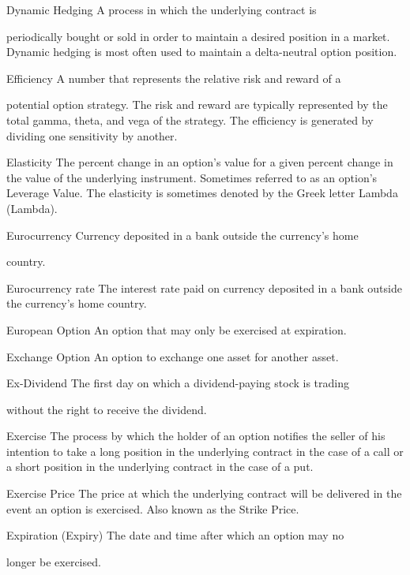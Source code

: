 Dynamic Hedging A  process  in  which  the  underlying  contract  is\par
periodically bought or sold in order to maintain a desired position in a market. Dynamic hedging is most often used to maintain a delta-neutral option position.\par
Efficiency A number that represents the relative risk and reward of a\par
potential option strategy. The risk and reward are typically represented by the total gamma, theta, and vega of the strategy. The efficiency is generated by dividing one sensitivity by another.\par
Elasticity The percent change in an option's value for a given percent change in the value of the underlying instrument. Sometimes referred to as an option's Leverage Value. The elasticity is sometimes denoted by the Greek letter Lambda (Lambda).\par
Eurocurrency Currency deposited in a bank outside the currency's home\par
country.\par
Eurocurrency rate The interest rate paid on currency deposited in a bank outside the currency's home country.\par
European Option An option that may only be exercised at expiration.\par
Exchange Option An option to exchange one asset for another asset.\par
Ex-Dividend The first day on which a dividend-paying stock is trading\par
without the right to receive the dividend.\par
Exercise The process by which the holder of an option notifies the seller of his intention to take a long position in the underlying contract in the case of a call or a short position in the underlying contract in the case of a put.\par
Exercise Price The price at which the underlying contract will be delivered in the event an option is exercised. Also known as the Strike Price.\par
Expiration (Expiry) The date and time after which an option may no\par
longer be exercised.\par

